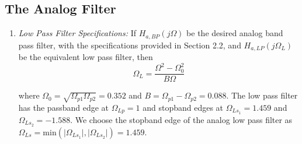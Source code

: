 \documentclass{article}
\begin{document}
\subsection{The Analog Filter}
\begin{enumerate}

\item {\em Low Pass Filter Specifications:}  If $H_{a, BP}(j\Omega)$ be the desired analog band
pass filter,  with the specifications provided in Section 2.2, and $H_{a,LP}(j\Omega_L)$ 
be the equivalent low pass filter, then
\begin{equation}
\label{transition}
\Omega_L = \frac{\Omega^2 - \Omega_0^2}{B\Omega}
\end{equation}

where $\Omega_0 = \sqrt{\Omega_{p1}\Omega_{p2}} = 0.352$ and $B = \Omega_{p1} - \Omega_{p2} = 0.088$.  The low pass filter has
the passband edge at $\Omega_{Lp} = 1$ and stopband edges at $\Omega_{Ls_1} = 1.459$ and $\Omega_{Ls_2} = -1.588$.  We choose the stopband edge of the analog low pass filter as $\Omega_{Ls} = \mbox{min}(\vert \Omega_{Ls_1}\vert,\vert \Omega_{Ls_2}\vert) = 1.459$.


\end{enumerate}
\end{document}
